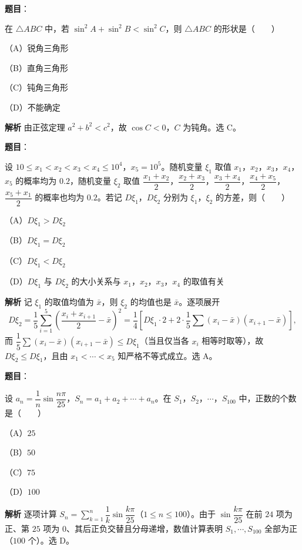 \begin{answer}

\textbf{题目}：

在 $\triangle ABC$ 中，若 $\sin^2A+\sin^2B<\sin^2C$，则 $\triangle ABC$ 的形状是\mbox{（　　）}

（A）锐角三角形

（B）直角三角形

（C）钝角三角形

（D）不能确定

\textbf{解析}
由正弦定理 $a^2+b^2<c^2$，故 $\cos C<0$，$C$ 为钝角。选 C。


\end{answer}
\begin{answer}

\textbf{题目}：

设 $10\leqslant x_1<x_2<x_3<x_4\leqslant10^4$，$x_5=10^5$。随机变量 $\xi_1$ 取值 $x_1$，$x_2$，$x_3$，$x_4$，$x_5$ 的概率均为 $0.2$，随机变量 $\xi_2$ 取值 $\dfrac{x_1+x_2}2$，$\dfrac{x_2+x_3}2$，$\dfrac{x_3+x_4}2$，$\dfrac{x_4+x_5}2$，$\dfrac{x_5+x_1}2$ 的概率也均为 $0.2$。若记 $D\xi_1$，$D\xi_2$ 分别为 $\xi_1$，$\xi_2$ 的方差，则\mbox{（　　）}

（A）$D\xi_1>D\xi_2$

（B）$D\xi_1=D\xi_2$

（C）$D\xi_1<D\xi_2$

（D）$D\xi_1$ 与 $D\xi_2$ 的大小关系与 $x_1$，$x_2$，$x_3$，$x_4$ 的取值有关

\textbf{解析}
记 $\xi_1$ 的取值均值为 $\bar x$，则 $\xi_2$ 的均值也是 $\bar x$。逐项展开
\nopagebreak[4]
\[D\xi_2=\frac15\sum_{i=1}^5\left(\frac{x_i+x_{i+1}}2-\bar x\right)^2=\frac14\left[D\xi_1\cdot2+2\cdot\frac15\sum(x_i-\bar x)(x_{i+1}-\bar x)\right],\]
而 $\dfrac15\sum(x_i-\bar x)(x_{i+1}-\bar x)\leqslant D\xi_1$（当且仅当各 $x_i$ 相等时取等），故 $D\xi_2\leqslant D\xi_1$，且由 $x_1<\cdots<x_5$ 知严格不等式成立。选 A。


\end{answer}
\begin{answer}

\textbf{题目}：

设 $a_n=\dfrac1n\sin\dfrac{n\pi}{25}$，$S_n=a_1+a_2+\cdots+a_n$。在 $S_1$，$S_2$，$\cdots$，$S_{100}$ 中，正数的个数是\mbox{（　　）}

（A）$25$

（B）$50$

（C）$75$

（D）$100$

\textbf{解析}
逐项计算 $S_n=\sum_{k=1}^n\dfrac1k\sin\dfrac{k\pi}{25}$（$1\leqslant n\leqslant100$）。由于 $\sin\dfrac{k\pi}{25}$ 在前 $24$ 项为正、第 $25$ 项为 $0$、其后正负交替且分母递增，数值计算表明 $S_1,\cdots,S_{100}$ 全部为正（$100$ 个）。选 D。


\end{answer}

